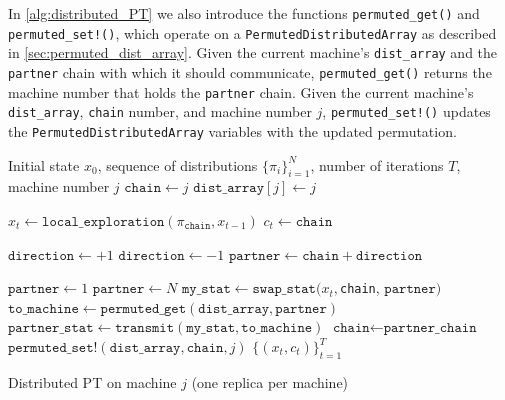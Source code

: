 \medskip 
In \cref{alg:distributed_PT} we also introduce the functions 
\texttt{permuted\_get()} and \texttt{permuted\_set!()}, which operate 
on a  \texttt{PermutedDistributedArray} as described  in \cref{sec:permuted_dist_array}.
Given the current machine's \texttt{dist\_array} and the 
\texttt{partner} chain with which it should communicate, 
\texttt{permuted\_get()} returns the machine number that holds the \texttt{partner} chain. 
Given the current machine's \texttt{dist\_array}, \texttt{chain} number, and machine number $j$,
\texttt{permuted\_set!()} updates the \texttt{PermutedDistributedArray} variables 
with the updated permutation.

\begin{algorithm}[t]
	\begin{algorithmic}[1]
    \Require Initial state $x_0$, sequence of distributions $\{\pi_i\}_{i=1}^N$, 
      number of iterations $T$, machine number $j$
    \State $\texttt{chain} \gets j$ 
    \State $\texttt{dist\_array}[j] \gets j$ 
		
    
     \State $x_t \gets \texttt{local\_exploration}(\pi_\texttt{chain}, x_{t-1})$
    \State $c_t \gets \texttt{chain}$ 
    
		    \State $\texttt{direction} \gets +1$
		  \Else
		    \State $\texttt{direction} \gets -1$
		  \EndIf
		  \State $\texttt{partner} \gets \texttt{chain} + \texttt{direction}$

     
        \State $\texttt{partner} \gets 1$ 
        \State $\texttt{partner} \gets N$
      \EndIf
	    \State $\texttt{my\_stat} \gets \texttt{swap\_stat}(x_t, $\texttt{chain}, $\texttt{partner} )$  
      \State $\texttt{to\_machine} \gets  \texttt{permuted\_get}(\texttt{dist\_array}, \texttt{partner})$
      \State $\texttt{partner\_stat} \gets \texttt{transmit}(\texttt{my\_stat}, \texttt{to\_machine})$
        \State $\texttt{chain} \gets \texttt{partner\_chain}$
      \EndIf
      \State $\texttt{permuted\_set!}(\texttt{dist\_array}, \texttt{chain}, j)$ 
		\EndFor
    \State \Return $\{(x_t, c_t)\}_{t=1}^T$
	\end{algorithmic}
  \caption{Distributed PT on machine $j$ (one replica per machine)}
  \label{alg:distributed_PT}
\end{algorithm}

